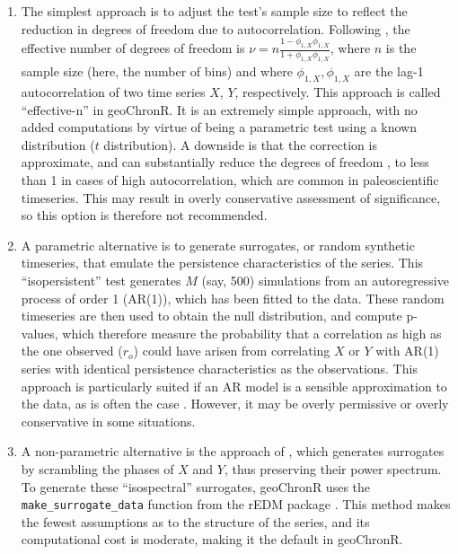 \documentclass[gchron, manuscript]{copernicus}
\begin{document}
\begin{enumerate}
\def\labelenumi{\arabic{enumi}.}
\item
  The simplest approach is to adjust the test's sample size to reflect
  the reduction in degrees of freedom due to autocorrelation. Following
  \citet{dawdy1964statistical}, the effective number of degrees of
  freedom is
  \(\nu = n \frac{1-\phi_{1,X}\phi_{1,X}}{1+\phi_{1,X}\phi_{1,X}}\),
  where \(n\) is the sample size (here, the number of bins) and where
  \(\phi_{1,X}, \phi_{1,X}\) are the lag-1 autocorrelation of two time
  series \(X\), \(Y\), respectively. This approach is called
  ``effective-n'' in geoChronR. It is an extremely simple approach, with
  no added computations by virtue of being a parametric test using a
  known distribution (\(t\) distribution). A downside is that the
  correction is approximate, and can substantially reduce the degrees of
  freedom \citep{Hu_epsl17}, to less than 1 in cases of high
  autocorrelation, which are common in paleoscientific timeseries. This
  may result in overly conservative assessment of significance, so this
  option is therefore not recommended.
\item
  A parametric alternative is to generate surrogates, or random
  synthetic timeseries, that emulate the persistence characteristics of
  the series. This ``isopersistent'' test generates \(M\) (say, 500)
  simulations from an autoregressive process of order 1 (AR(1)), which
  has been fitted to the data. These random timeseries are then used to
  obtain the null distribution, and compute p-values, which therefore
  measure the probability that a correlation as high as the one observed
  (\(r_o\)) could have arisen from correlating \(X\) or \(Y\) with AR(1)
  series with identical persistence characteristics as the observations.
  This approach is particularly suited if an AR model is a sensible
  approximation to the data, as is often the case \citep{Ghil02}.
  However, it may be overly permissive or overly conservative in some
  situations.
\item
  A non-parametric alternative is the approach of
  \citet{Ebisuzaki_JClim97}, which generates surrogates by scrambling
  the phases of \(X\) and \(Y\), thus preserving their power spectrum.
  To generate these ``isospectral'' surrogates, geoChronR uses the
  \texttt{make\_surrogate\_data} function from the rEDM package
  \citep{rEDM}. This method makes the fewest assumptions as to the
  structure of the series, and its computational cost is moderate,
  making it the default in geoChronR.
\end{enumerate}
\end{document}
